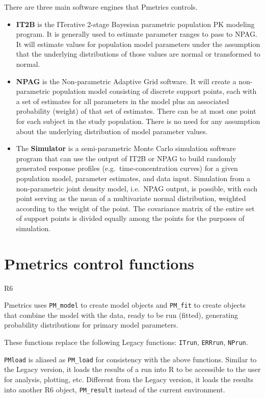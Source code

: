 \documentclass[
]{book}
\begin{document}
There are three main software engines that Pmetrics controls.

\begin{itemize}
\item
  \textbf{IT2B} is the ITerative 2-stage Bayesian parametric population PK modeling
  program. It is generally used to estimate parameter ranges to pass to
  NPAG. It will estimate values for population model parameters under the
  assumption that the underlying distributions of those values are normal
  or transformed to normal.
\item
  \textbf{NPAG} is the Non-parametric Adaptive Grid software. It will create a
  non-parametric population model consisting of discrete support points,
  each with a set of estimates for all parameters in the model plus an
  associated probability (weight) of that set of estimates. There can be
  at most one point for each subject in the study population. There is no
  need for any assumption about the underlying distribution of model
  parameter values.
\item
  The \textbf{Simulator} is a semi-parametric Monte Carlo simulation software
  program that can use the output of IT2B or NPAG to build randomly
  generated response profiles (e.g.~time-concentration curves) for a given
  population model, parameter estimates, and data input. Simulation from a
  non-parametric joint density model, i.e.~NPAG output, is possible, with
  each point serving as the mean of a multivariate normal distribution,
  weighted according to the weight of the point. The covariance matrix of
  the entire set of support points is divided equally among the points for
  the purposes of simulation.
\end{itemize}

\hypertarget{pmetrics-control-functions}{%
\section{Pmetrics control functions}\label{pmetrics-control-functions}}

{R6}

Pmetrics uses \texttt{PM\_model} to create model objects and \texttt{PM\_fit} to create
objects that combine the model with the data, ready to be run (fitted),
generating probability distributions for primary model parameters.

These functions replace the following Legacy functions: \texttt{ITrun}, \texttt{ERRrun},
\texttt{NPrun}.

\texttt{PMload} is aliased as \texttt{PM\_load} for consistency with the above functions.
Similar to the Legacy version, it loads the results of a run into R to be
accessible to the user for analysis, plotting, etc. Different from the Legacy
version, it loads the results into another R6 object, \texttt{PM\_result} instead of
the current environment.
\end{document}
